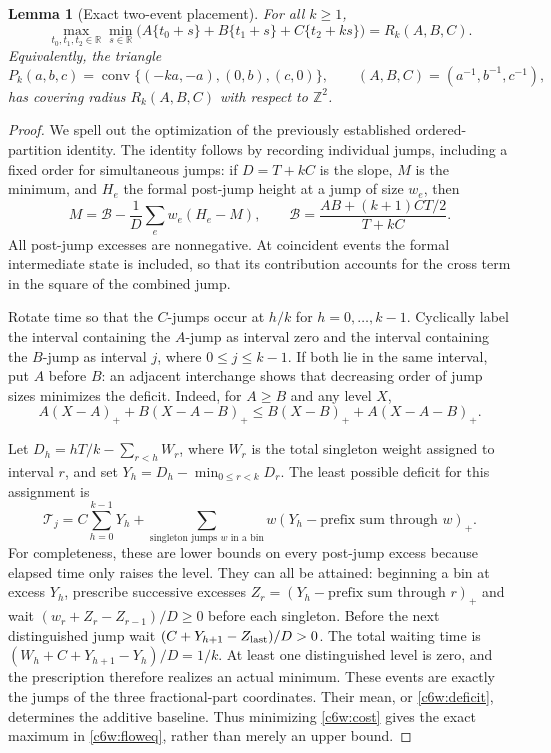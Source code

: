 \documentclass[11pt,a4paper]{article}
\newtheorem{lemma}[theorem]{Lemma}
\theoremstyle{remark}\newtheorem{remark}[theorem]{Remark}
\DeclareMathOperator{\conv}{conv}
\newcommand{\R}{\mathbb R}\newcommand{\Z}{\mathbb Z}
\begin{document}
\begin{lemma}[Exact two-event placement]\label{c6w:flow}
For all $k\ge1$,
\begin{equation}\label{c6w:floweq}
 \max_{t_0,t_1,t_2\in\R}\min_{s\in\R}
 \bigl(A\{t_0+s\}+B\{t_1+s\}+C\{t_2+ks\}\bigr)
 =R_k(A,B,C).
\end{equation}
Equivalently, the triangle
\[
 P_k(a,b,c)=\conv\{(-ka,-a),(0,b),(c,0)\},
 \qquad (A,B,C)=(a^{-1},b^{-1},c^{-1}),
\]
has covering radius $R_k(A,B,C)$ with respect to $\Z^2$.
\end{lemma}

\begin{proof}
We spell out the optimization of the previously established
ordered-partition identity.  The identity follows by recording
individual jumps, including a fixed order for simultaneous jumps:
if $D=T+kC$ is the slope, $M$ is the minimum, and $H_e$ the
formal post-jump height at a jump of size $w_e$, then
\begin{equation}\label{c6w:deficit}
 M=\mathcal B-\frac1D\sum_e w_e(H_e-M),
 \qquad
 \mathcal B=\frac{AB+(k+1)CT/2}{T+kC}.
\end{equation}
All post-jump excesses are nonnegative.  At coincident events the
formal intermediate state is included, so that its contribution
accounts for the cross term in the square of the combined jump.

Rotate time so that the $C$-jumps occur at $h/k$ for
$h=0,\ldots,k-1$.  Cyclically label the interval containing the
$A$-jump as interval zero and the interval containing the $B$-jump
as interval $j$, where $0\le j\le k-1$.  If both lie in the same
interval, put $A$ before $B$: an adjacent interchange shows that
decreasing order of jump sizes minimizes the deficit.  Indeed,
for $A\ge B$ and any level $X$,
\[
 A(X-A)_++B(X-A-B)_+
 \le B(X-B)_++A(X-A-B)_+.
\]

Let $D_h=hT/k-\sum_{r<h}W_r$, where $W_r$ is the total singleton
weight assigned to interval $r$, and set
$Y_h=D_h-\min_{0\le r<k}D_r$.
The least possible deficit for this assignment is
\begin{equation}\label{c6w:cost}
 \mathcal T_j=C\sum_{h=0}^{k-1}Y_h
 +\sum_{\text{singleton jumps }w\text{ in a bin}}
      w(Y_h-\text{prefix sum through }w)_+.
\end{equation}
For completeness, these are lower bounds on every post-jump
excess because elapsed time only raises the level.  They can all
be attained: beginning a bin at excess $Y_h$, prescribe successive
excesses $Z_r=(Y_h-\text{prefix sum through }r)_+$ and wait
$(w_r+Z_r-Z_{r-1})/D\ge0$ before each singleton.  Before the next
distinguished jump wait $(C+Y_{h+1}-Z_{\rm last})/D>0$.
The total waiting time is
$(W_h+C+Y_{h+1}-Y_h)/D=1/k$.
At least one distinguished level is zero, and the prescription
therefore realizes an actual minimum.  These events are exactly
the jumps of the three fractional-part coordinates.  Their mean,
or \eqref{c6w:deficit}, determines the additive baseline.  Thus
minimizing \eqref{c6w:cost} gives the exact maximum in
\eqref{c6w:floweq}, rather than merely an upper bound.


\end{proof}
\end{document}
